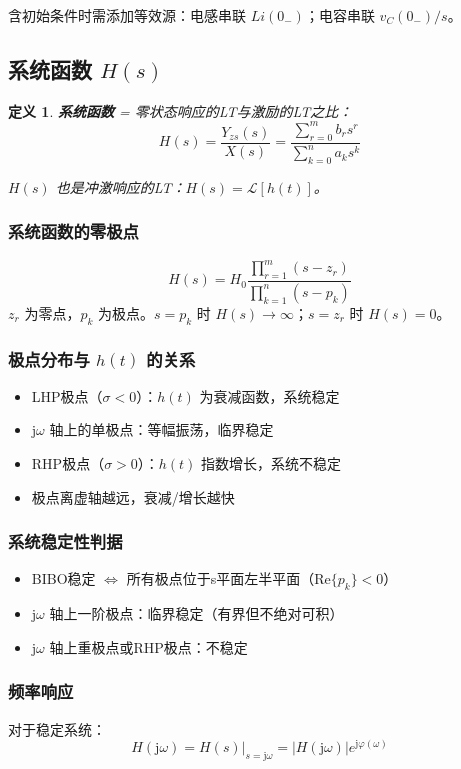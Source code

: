 \documentclass[11pt,a4paper]{ctexart}
\newtheorem{definition}{定义}[section]
\newcommand{\LT}{\mathcal{L}}           %
\newcommand{\jj}{\mathrm{j}}            %
\begin{document}
含初始条件时需添加等效源：电感串联 $Li(0_-)$；电容串联 $v_C(0_-)/s$。

\subsection{系统函数 $H(s)$}

\begin{definition}
\textbf{系统函数} = 零状态响应的LT与激励的LT之比：
\[
H(s) = \frac{Y_{zs}(s)}{X(s)} = \frac{\sum_{r=0}^{m} b_r s^r}{\sum_{k=0}^{n} a_k s^k}
\]

$H(s)$ 也是冲激响应的LT：$H(s) = \LT[h(t)]$。
\end{definition}

\subsubsection{系统函数的零极点}
\[
H(s) = H_0\frac{\prod_{r=1}^{m}(s - z_r)}{\prod_{k=1}^{n}(s - p_k)}
\]
$z_r$ 为零点，$p_k$ 为极点。$s = p_k$ 时 $H(s) \to \infty$；$s = z_r$ 时 $H(s) = 0$。

\subsubsection{极点分布与 $h(t)$ 的关系}
\begin{itemize}
    \item LHP极点（$\sigma < 0$）：$h(t)$ 为衰减函数，系统稳定
    \item $\jj\omega$ 轴上的单极点：等幅振荡，临界稳定
    \item RHP极点（$\sigma > 0$）：$h(t)$ 指数增长，系统不稳定
    \item 极点离虚轴越远，衰减/增长越快
\end{itemize}

\subsubsection{系统稳定性判据}
\begin{itemize}
    \item BIBO稳定 $\Leftrightarrow$ 所有极点位于s平面左半平面（$\mathrm{Re}\{p_k\} < 0$）
    \item $\jj\omega$ 轴上一阶极点：临界稳定（有界但不绝对可积）
    \item $\jj\omega$ 轴上重极点或RHP极点：不稳定
\end{itemize}

\subsubsection{频率响应}
对于稳定系统：
\[
H(\jj\omega) = H(s)\big|_{s=\jj\omega} = |H(\jj\omega)|e^{\jj\varphi(\omega)}
\]
\end{document}
